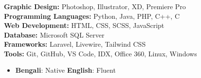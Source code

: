 \documentclass[10pt,a4paper,ragged2e,withhyper]{files/altacv}
\begin{document}
\begin{paracol}{2}
    \switchcolumn


    \newcommand{\skilltag}[2]{\textbf{#1:} #2}
    \skilltag{Graphic Design}{Photoshop, Illustrator, XD, Premiere Pro}\\[0.5em] %
    \skilltag{Programming Languages}{Python, Java, PHP, C++, C}\\[0.5em]
    \skilltag{Web Development}{HTML, CSS, SCSS, JavaScript}\\[0.5em]
    \skilltag{Database}{Microsoft SQL Server}\\[0.5em]
    \skilltag{Frameworks}{Laravel, Livewire, Tailwind CSS}\\[0.5em]
    \skilltag{Tools}{Git, GitHub, VS Code, IDX, Office 360, Linux, Windows}
    \vspace{4mm}

    \vspace{4mm}

    \begin{itemize}[leftmargin=1cm, label={\color{primary}}, itemsep=0pt]
        \item \textbf{Bengali}: Native \hspace{0.5cm} \textbf{English}: Fluent
    \end{itemize}

\end{paracol}
\end{document}

